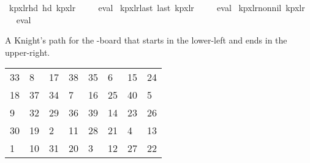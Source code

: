\begin{isabellebody}
{\isafoldproof}%
%
\isadelimproof
\isanewline
%
\endisadelimproof
\isanewline
{}\isamarkupfalse%
\ kp{\isacharunderscore}{\kern0pt}{}x{}{\isacharunderscore}{\kern0pt}lr{\isacharunderscore}{\kern0pt}hd{\isacharcolon}{\kern0pt}\ {\isachardoublequoteopen}hd\ kp{}x{}lr\ {\isacharequal}{\kern0pt}\ {\isacharparenleft}{\kern0pt}{}{\isacharcomma}{\kern0pt}{}{\isacharparenright}{\kern0pt}{\isachardoublequoteclose}%
\isadelimproof
\ %
\endisadelimproof
%
\isatagproof
{}\isamarkupfalse%
\ eval%
\endisatagproof
{\isafoldproof}%
%
\isadelimproof
%
\endisadelimproof
\isanewline
\isanewline
{}\isamarkupfalse%
\ kp{\isacharunderscore}{\kern0pt}{}x{}{\isacharunderscore}{\kern0pt}lr{\isacharunderscore}{\kern0pt}last{\isacharcolon}{\kern0pt}\ {\isachardoublequoteopen}last\ kp{}x{}lr\ {\isacharequal}{\kern0pt}\ {\isacharparenleft}{\kern0pt}{}{\isacharcomma}{\kern0pt}{}{\isacharparenright}{\kern0pt}{\isachardoublequoteclose}%
\isadelimproof
\ %
\endisadelimproof
%
\isatagproof
{}\isamarkupfalse%
\ eval%
\endisatagproof
{\isafoldproof}%
%
\isadelimproof
%
\endisadelimproof
\isanewline
\isanewline
{}\isamarkupfalse%
\ kp{\isacharunderscore}{\kern0pt}{}x{}{\isacharunderscore}{\kern0pt}lr{\isacharunderscore}{\kern0pt}non{\isacharunderscore}{\kern0pt}nil{\isacharcolon}{\kern0pt}\ {\isachardoublequoteopen}kp{}x{}lr\ {\isasymnoteq}\ {\isacharbrackleft}{\kern0pt}{\isacharbrackright}{\kern0pt}{\isachardoublequoteclose}%
\isadelimproof
\ %
\endisadelimproof
%
\isatagproof
{}\isamarkupfalse%
\ eval%
\endisatagproof
{\isafoldproof}%
%
\isadelimproof
%
\endisadelimproof
%
\begin{isamarkuptext}%
A Knight's path for the -board that starts in the lower-left and ends in the 
upper-right.
  \begin{table}[H]
    \begin{tabular}{llllllll}
      33 &  8 & 17 & 38 & 35 &  6 & 15 & 24 \\
      18 & 37 & 34 &  7 & 16 & 25 & 40 &  5 \\
       9 & 32 & 29 & 36 & 39 & 14 & 23 & 26 \\
      30 & 19 &  2 & 11 & 28 & 21 &  4 & 13 \\
       1 & 10 & 31 & 20 &  3 & 12 & 27 & 22

\end{tabular}
\end{table}
\end{isamarkuptext}
\end{isabellebody}
